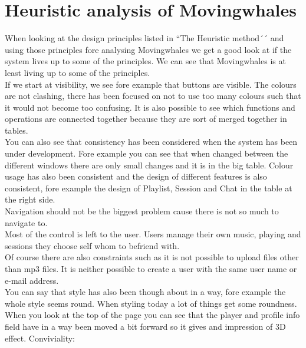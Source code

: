 \section{Heuristic analysis of Movingwhales}

When looking at the design principles listed in ``The Heuristic method´´ and using those principles fore analysing Movingwhales we get a good look at if the system lives up to some of the principles. We can see that Movingwhales is at least living up to some of the principles.\\
	If we start at visibility, we see fore example that buttons are visible. The colours are not clashing, there has been focused on not to use too many colours such that it would not become too confusing. It is also possible to see which functions and operations are connected together because they are sort of merged together in tables.\\
	You can also see that consistency has been considered when the system has been under development. Fore example you can see that when changed between the different windows there are only small changes and it is in the big table. Colour usage has also been consistent and the design of different features  is also consistent, fore example the design of Playlist, Session and Chat in the table at the right side.\\
	Navigation should not be the biggest problem cause there is not so much to navigate to.\\
	Most of the control is left to the user. Users manage their own music, playing and sessions they choose self whom to befriend with.\\ 
	Of course there are also constraints such as it is not possible to upload files other than mp3 files. It is neither possible to create a user with the same user name or e-mail address.\\
	You can say that style has also been though about in a way, fore example the whole style seems round. When styling today a lot of things get some roundness. When you look at the top of the page you can see that the player and profile info field have in a way been moved a bit forward so it gives and impression of 3D effect.
	Conviviality: %
